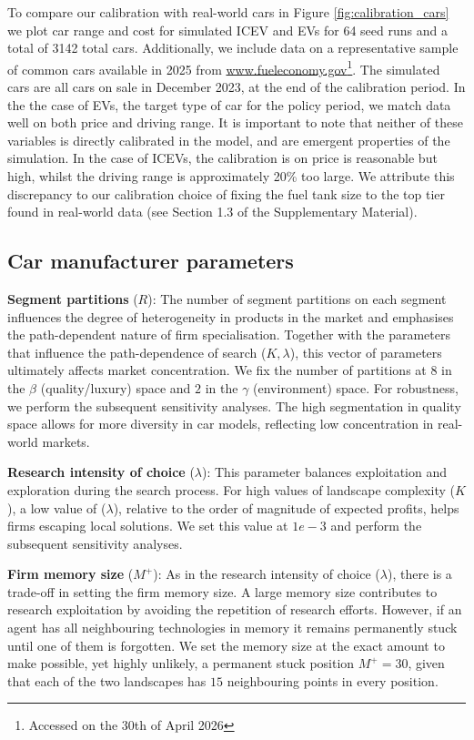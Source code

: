 \documentclass[12pt]{article}
\begin{document}
    To compare our calibration with real-world cars in Figure \ref{fig:calibration_cars} we plot car range and cost for simulated ICEV and EVs for 64 seed runs and a total of 3142 total cars. Additionally, we include data on a representative sample of common cars available in 2025 from \href{fueleconomy.gov}{www.fueleconomy.gov}\footnote{Accessed on the 30th of April 2026}. The simulated cars are all cars on sale in December 2023, at the end of the calibration period. In the the case of EVs, the target type of car for the policy period, we match data well on both price and driving range. It is important to note that neither of these variables is directly calibrated in the model, and are emergent properties of the simulation. In the case of ICEVs, the calibration is on price is reasonable but high, whilst the driving range is approximately 20\% too large. We attribute this discrepancy to our calibration choice of fixing the fuel tank size to the top tier found in real-world data (see Section 1.3 of the Supplementary Material).
	
	\subsection{Car manufacturer parameters} \label{Callibration_Manufacturer}
	
	\textbf{Segment partitions} ($R$): The number of segment partitions on each segment influences the degree of heterogeneity in products in the market and emphasises the path-dependent nature of firm specialisation. Together with the parameters that influence the path-dependence of search ($K,\lambda$), this vector of parameters ultimately affects market concentration. We fix the number of partitions at $8$ in the $\beta$ (quality/luxury) space and $2$ in the $\gamma$ (environment) space. For robustness, we perform the subsequent sensitivity analyses. The high segmentation in quality space allows for more diversity in car models, reflecting low concentration in real-world markets.
	
	\textbf{Research intensity of choice} ($\lambda$): This parameter balances exploitation and exploration during the search process. For high values of landscape complexity ($K$), a low value of ($\lambda$), relative to the order of magnitude of expected profits, helps firms escaping local solutions. We set this value at $1e-3$ and perform the subsequent sensitivity analyses. 
	
	\textbf{Firm memory size} ($M^+$): As in the research intensity of choice ($\lambda$), there is a trade-off in setting the firm memory size. A large memory size contributes to research exploitation by avoiding the repetition of research efforts. However, if an agent has all neighbouring technologies in memory it remains permanently stuck until one of them is forgotten. We set the memory size at the exact amount to make possible, yet highly unlikely, a permanent stuck position $M^+=30$, given that each of the two landscapes has $15$ neighbouring points in every position. 
	
\end{document}
